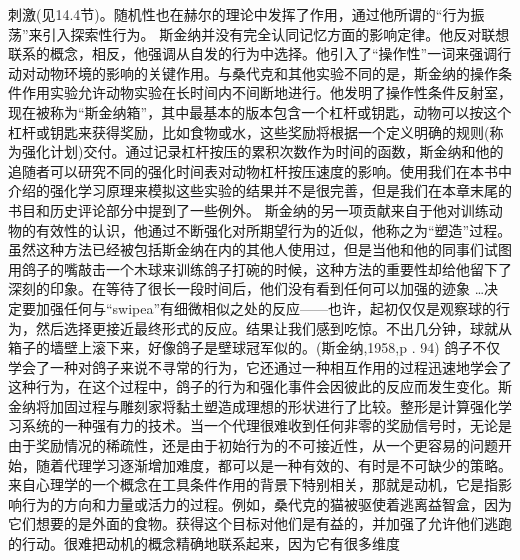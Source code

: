 刺激(见14.4节)。随机性也在赫尔的理论中发挥了作用，通过他所谓的“行为振荡”来引入探索性行为。
斯金纳并没有完全认同记忆方面的影响定律。他反对联想联系的概念，相反，他强调从自发的行为中选择。他引入了“操作性”一词来强调行动对动物环境的影响的关键作用。与桑代克和其他实验不同的是，斯金纳的操作条件作用实验允许动物实验在长时间内不间断地进行。他发明了操作性条件反射室，现在被称为“斯金纳箱”，其中最基本的版本包含一个杠杆或钥匙，动物可以按这个杠杆或钥匙来获得奖励，比如食物或水，这些奖励将根据一个定义明确的规则(称为强化计划)交付。通过记录杠杆按压的累积次数作为时间的函数，斯金纳和他的追随者可以研究不同的强化时间表对动物杠杆按压速度的影响。使用我们在本书中介绍的强化学习原理来模拟这些实验的结果并不是很完善，但是我们在本章末尾的书目和历史评论部分中提到了一些例外。
斯金纳的另一项贡献来自于他对训练动物的有效性的认识，他通过不断强化对所期望行为的近似，他称之为“塑造”过程。虽然这种方法已经被包括斯金纳在内的其他人使用过，但是当他和他的同事们试图用鸽子的嘴敲击一个木球来训练鸽子打碗的时候，这种方法的重要性却给他留下了深刻的印象。在等待了很长一段时间后，他们没有看到任何可以加强的迹象
…决定要加强任何与“swipea”有细微相似之处的反应——也许，起初仅仅是观察球的行为，然后选择更接近最终形式的反应。结果让我们感到吃惊。不出几分钟，球就从箱子的墙壁上滚下来，好像鸽子是壁球冠军似的。(斯金纳,1958,p . 94)
鸽子不仅学会了一种对鸽子来说不寻常的行为，它还通过一种相互作用的过程迅速地学会了这种行为，在这个过程中，鸽子的行为和强化事件会因彼此的反应而发生变化。斯金纳将加固过程与雕刻家将黏土塑造成理想的形状进行了比较。整形是计算强化学习系统的一种强有力的技术。当一个代理很难收到任何非零的奖励信号时，无论是由于奖励情况的稀疏性，还是由于初始行为的不可接近性，从一个更容易的问题开始，随着代理学习逐渐增加难度，都可以是一种有效的、有时是不可缺少的策略。
来自心理学的一个概念在工具条件作用的背景下特别相关，那就是动机，它是指影响行为的方向和力量或活力的过程。例如，桑代克的猫被驱使着逃离益智盒，因为它们想要的是外面的食物。获得这个目标对他们是有益的，并加强了允许他们逃跑的行动。很难把动机的概念精确地联系起来，因为它有很多维度

